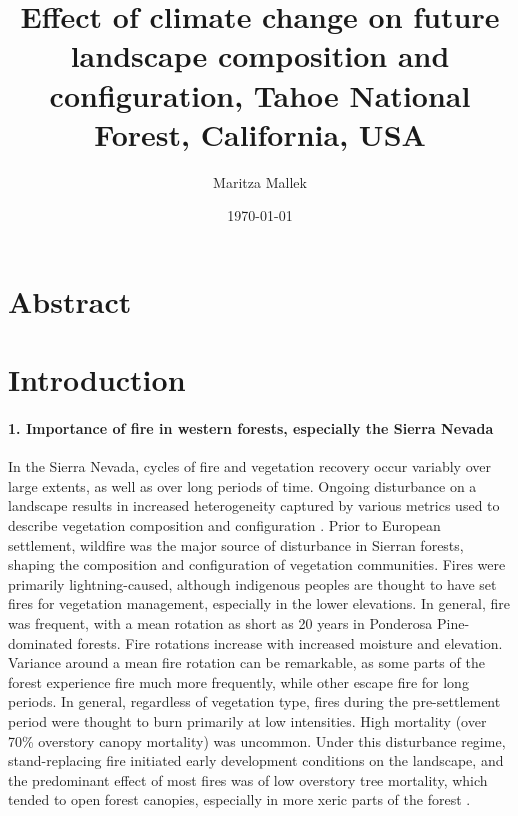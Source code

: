 \documentclass[12pt]{article}
\title{Effect of climate change on future landscape composition and configuration, Tahoe National Forest, California, USA}
\author{ Maritza Mallek }
\date{\today}
\begin{document}
\maketitle
\begin{spacing}{1}


\section{Abstract}

\section{Introduction}

\paragraph{1. Importance of fire in western forests, especially the Sierra Nevada}
In the Sierra Nevada, cycles of fire and vegetation recovery occur variably over large extents, as well as over long periods of time. Ongoing disturbance on a landscape results in increased heterogeneity captured by various metrics used to describe vegetation composition and configuration \citep{Monica2008}. Prior to European settlement, wildfire was the major source of disturbance in Sierran forests, shaping the composition and configuration of vegetation communities. Fires were primarily lightning-caused, although indigenous peoples are thought to have set fires for vegetation management, especially in the lower elevations. In general, fire was frequent, with a mean rotation as short as 20 years in Ponderosa Pine-dominated forests. Fire rotations increase with increased moisture and elevation. Variance around a mean fire rotation can be remarkable, as some parts of the forest experience fire much more frequently, while other escape fire for long periods. In general, regardless of vegetation type, fires during the pre-settlement period were thought to burn primarily at low intensities. High mortality (over 70\% overstory canopy mortality) was uncommon. Under this disturbance regime, stand-replacing fire initiated early development conditions on the landscape, and the predominant effect of most fires was of low overstory tree mortality, which tended to open forest canopies, especially in more xeric parts of the forest \citep{Mallek2013,Safford2014,SNEP1996,SNEP1996a}. 


\end{spacing}
\end{document}
